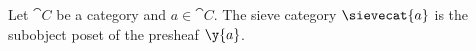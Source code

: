 \begin{definition}
Let $\cat{C}$ be a category 
and $a \in \cat{C}$.
The sieve category $\sievecat{a}$ 
is the subobject poset of the presheaf $\y{a}$.
\end{definition}
